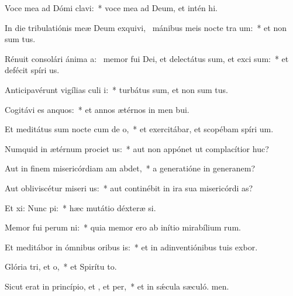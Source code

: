 \item Voce mea ad Dómi clavi:~* voce mea ad Deum, et intén hi.
\item In die tribulatiónis meæ Deum exquivi,~\pscross{} mánibus meis nocte tra um:~* et non sum tus.
\item Rénuit consolári ánima a:~\pscross{} memor fui Dei, et delectátus sum, et exci sum:~* et defécit spíri us.
\item Anticipavérunt vigílias culi i:~* turbátus sum, et non sum tus.
\item Cogitávi es anquos:~* et annos ætérnos in men bui.
\item Et meditátus sum nocte cum de o,~* et exercitábar, et scopébam spíri um.
\item Numquid in ætérnum prociet us:~* aut non appónet ut complacítior  huc?
\item Aut in finem misericórdiam am abdet,~* a generatióne in generanem?
\item Aut obliviscétur miseri us:~* aut continébit in ira sua misericórdi as?
\item Et xi: Nunc pi:~* hæc mutátio déxteræ si.
\item Memor fui perum ni:~* quia memor ero ab inítio mirabílium rum.
\item Et meditábor in ómnibus oribus is:~* et in adinventiónibus tuis exbor.
\item Glória tri, et o,~* et Spirítu to.
\item Sicut erat in princípio, et , et per,~* et in sǽcula sæculó. men.
